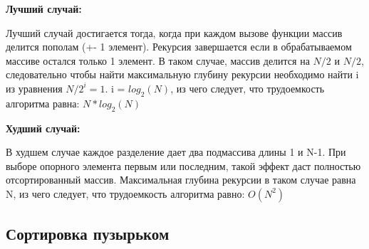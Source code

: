 \documentclass[12pt]{report}
\begin{document}
\begin{center}
	\textbf{Лучший случай:}
\end{center}
	Лучший случай достигается тогда, когда при каждом вызове функции массив делится пополам (+- 1 элемент).
Рекурсия завершается если в обрабатываемом массиве остался только 1 элемент.
В таком случае, массив делится на {$N/2$} и {$N/2$}, следовательно чтобы найти максимальную глубину рекурсии необходимо найти i из уравнения {$N/2^i = 1$}. i = {$log_{2}(N)$}, из чего следует, что трудоемкость алгоритма равна: {$N*log_{2}(N)$}

\begin{center}
	\textbf{Худший случай:}
\end{center}
	В худшем случае каждое разделение дает два подмассива длины 1 и N-1. При выборе опорного элемента первым или последним, такой эффект даст полностью отсортированный массив.
	Максимальная глубина рекурсии в таком случае равна N, из чего следует, что трудоемкость алгоритма равно: {$O(N^2)$}

\subsection{Сортировка пузырьком}
\end{document}
